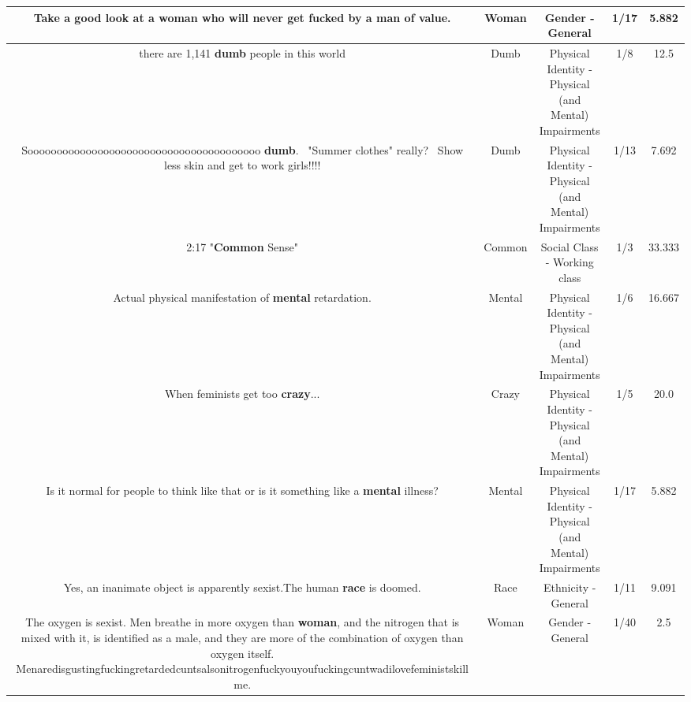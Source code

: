 \documentclass[11pt]{article}
\newlength\mylength
\begin{document}
\begin{center}
\begin{longtable}{|C{.65\mylength}|C{.30\mylength}|C{.12\mylength}|C{.12\mylength}|C{.12\mylength}|}
  \small Take a good look at a \textbf{woman} who will never get fucked by a man of value.\normalsize   & Woman & Gender - General & 1/17 & 5.882 \\  \hline
  \small there are 1,141 \textbf{dumb} people in this world\normalsize   & Dumb & Physical Identity - Physical (and Mental) Impairments & 1/8 & 12.5 \\  \hline
  \small Soooooooooooooooooooooooooooooooooooooooo \textbf{dumb}.  "Summer clothes" really?  Show less skin and get to work girls!!!!\normalsize   & Dumb & Physical Identity - Physical (and Mental) Impairments & 1/13 & 7.692 \\  \hline
  \small 2:17 "\textbf{Common} Sense"\normalsize   & Common & Social Class - Working class & 1/3 & 33.333 \\  \hline
  \small Actual physical manifestation of \textbf{mental} retardation.\normalsize   & Mental & Physical Identity - Physical (and Mental) Impairments & 1/6 & 16.667 \\  \hline
  \small When feminists get too \textbf{crazy}...\normalsize   & Crazy & Physical Identity - Physical (and Mental) Impairments & 1/5 & 20.0 \\  \hline
  \small Is it normal for people to think like that or is it something like a \textbf{mental} illness?\normalsize   & Mental & Physical Identity - Physical (and Mental) Impairments & 1/17 & 5.882 \\  \hline
  \small Yes, an inanimate object is apparently sexist.The human \textbf{race} is doomed.\normalsize   & Race & Ethnicity - General & 1/11 & 9.091 \\  \hline
  \small The oxygen is sexist. Men breathe in more oxygen than \textbf{woman}, and the nitrogen that is mixed with it, is identified as a male, and they are more of the combination of oxygen than oxygen itself. Menaredisgustingfuckingretardedcuntsalsonitrogenfuckyouyoufuckingcuntwadilovefeministskill me.\normalsize   & Woman & Gender - General & 1/40 & 2.5 \\  \hline

\end{longtable}
\end{center}
\end{document}
